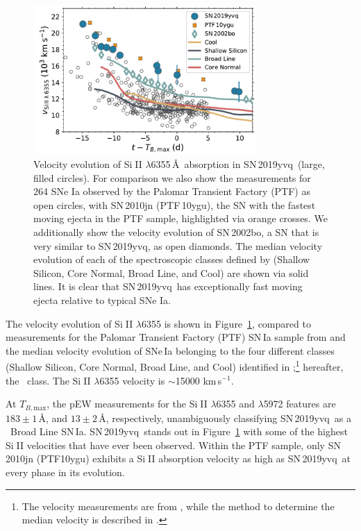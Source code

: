 \documentclass[twocolumn]{aastex63}
\def\ion#1#2{#1$\;${\footnotesize\rm{#2}}\relax}
\newcommand{\tbmax}{$T_{B,\mathrm{max}}$}
\newcommand{\kms}{km\,s$^{-1}$}
\newcommand{\sn}{SN\,2019yvq}
\begin{document}
\begin{figure}
    \centering
    \includegraphics[width=3.35in]{./figures/vel_evolution.pdf}
    \caption{Velocity evolution of \ion{Si}{II} $\lambda$6355\,\AA\
    absorption in \sn\ (large, filled circles). For comparison we also show
    the measurements for 264 SNe Ia observed by the Palomar Transient
    Factory (PTF) as open circles, with SN\,2010jn (PTF\,10ygu), the SN with
    the fastest moving ejecta in the PTF sample, highlighted via orange
    crosses. We additionally show the velocity evolution of SN\,2002bo, a SN
    that is very similar to \sn, as open diamonds. The median velocity
    evolution of each of the spectroscopic classes defined by
    \citet{Branch06} (Shallow Silicon, Core Normal, Broad Line, and Cool)
    are shown via solid lines. It is clear that \sn\ has exceptionally fast
    moving ejecta relative to typical SNe Ia.}
    \label{fig:vel_evo}
\end{figure}

The velocity evolution of \ion{Si}{II} $\lambda$6355 is shown in
Figure~\ref{fig:vel_evo}, compared to measurements for the Palomar Transient
Factory (PTF) SN\,Ia sample from \citet{Maguire14} and the median velocity
evolution of SNe\,Ia belonging to the four different classes (Shallow
Silicon, Core Normal, Broad Line, and Cool) identified in
\citet{Branch06};\footnote{The velocity measurements are from
\citet{Blondin12}, while the method to determine the median velocity is
described in \citet{Miller18}.} hereafter, the \citeauthor{Branch06}~class.
The \ion{Si}{II} $\lambda$6355 velocity is $\sim$15000 \kms.

At \tbmax, the pEW measurements for the \ion{Si}{II} $\lambda$6355 and
$\lambda$5972 features are $183\pm1$\,\AA, and $13\pm2$\,\AA, respectively,
unambiguously classifying \sn\ as a \citeauthor{Branch06}~Broad Line SN\,Ia.
\sn\ stands out in Figure~\ref{fig:vel_evo} with some of the highest
\ion{Si}{II} velocities that have ever been observed. Within the PTF sample,
only SN\,2010jn (PTF10ygu) exhibits a \ion{Si}{II} absorption velocity as
high as \sn\ at every phase in its evolution.
\end{document}
